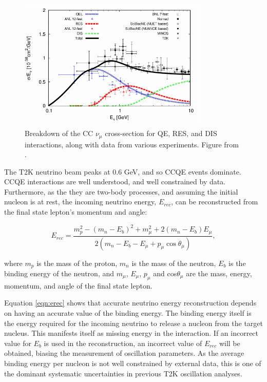 \begin{figure}[!htbp]
\centering
\includegraphics*[width=0.8\textwidth,clip]{figs/xsections}
\caption{Breakdown of the CC $\nu_\mu$ cross-section for QE, RES, and DIS interactions, along with data from various experiments. Figure from \cite{nuxsec}.
} \label{xsecpot}
\end{figure}

The T2K neutrino beam peaks at 0.6 GeV, and so CCQE events dominate. CCQE interactions are well understood, and well constrained by data. Furthermore, as the they are two-body processes, and assuming the initial nucleon is at rest, the incoming neutrino energy, $E_{rec}$, can be reconstructed from the final state lepton's momentum and angle:

\begin{equation}
E_{rec} = \frac{m_p^2 - (m_n - E_b)^2 + m_\mu^2 + 2(m_n - E_b)E_\mu}{2(m_n - E_b - E_\mu + p_\mu \cos \theta_\mu)},
\label{eqn:erec}
\end{equation}

where $m_p$ is the mass of the proton, $m_n$ is the mass of the neutron, $E_b$ is the binding energy of the neutron, and $m_\mu$, $E_\mu$, $p_\mu$ and cos$\theta_\mu$ are the mass, energy, momentum, and angle of the final state lepton.

Equation \ref{eqn:erec} shows that accurate neutrino energy reconstruction depends on having an accurate value of the binding energy. The binding energy itself is the energy required for the incoming neutrino to release a nucleon from the target nucleus. This manifests itself as missing energy in the interaction. If an incorrect value for $E_b$ is used in the reconstruction, an incorrect value of $E_{rec}$ will be obtained, biasing the measurement of oscillation parameters. As the average binding energy per nucleon is not well constrained by external data, this is one of the dominant systematic uncertainties in previous T2K oscillation analyses.

